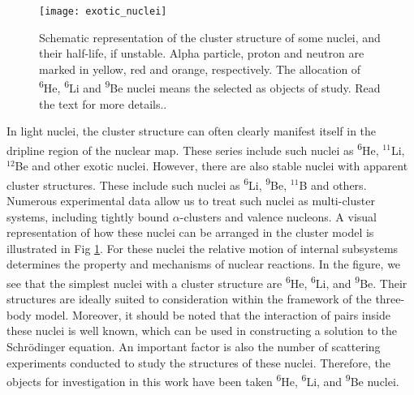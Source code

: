 \documentclass[
12pt, %
oneside, %
english, %
doublespacing, %
doublespacing, %
toctotoc, %
parskip, %
headsepline, %
]{MastersDoctoralThesis} %
\newcommand{\he}{\textsuperscript{6}He\xspace}
\newcommand{\li}{\textsuperscript{6}Li\xspace}
\newcommand{\be}{\textsuperscript{9}Be\xspace}
\begin{document}
\begin{figure}
\centering
\texttt{[image: exotic\_nuclei]}
\decoRule
\caption{ Schematic representation of the cluster structure of some nuclei, and their half-life, if unstable. Alpha particle, proton and neutron are marked in yellow, red and orange, respectively. The allocation of \he, \li and \be nuclei means the selected as objects of study. Read the text for more details..}
\label{fig:exotic_nuclei}
\end{figure}

In light nuclei, the cluster structure can often clearly  manifest itself in the dripline region of the nuclear map. 
These series include such nuclei as \he, $^{11}$Li, $^{12}$Be and other exotic nuclei. 
However, there are also stable nuclei with apparent cluster structures. These include such nuclei as \li, \be, $ ^{11}$B and others. Numerous experimental data \cite{canto2006fusion, brown2007, papka2007} allow us to treat such nuclei as multi-cluster systems, including tightly bound $\alpha$-clusters and valence nucleons. A visual representation of how these nuclei can be arranged in the cluster model is illustrated in Fig \ref{fig:exotic_nuclei}. 
For these nuclei the relative motion of internal subsystems determines the property and mechanisms of nuclear reactions. 
In the figure, we see that the simplest nuclei with a cluster structure are \he, \li, and \be. 
Their structures are ideally suited to consideration within the framework of the three-body model. 
Moreover, it should be noted that the interaction of pairs inside these nuclei is 
well known, which can be used in constructing a solution to the Schr\"{o}dinger equation. An important factor is also the number of scattering experiments conducted to study the structures of these nuclei.
Therefore, the objects for investigation in this work have been taken \he, \li, and \be nuclei.
\end{document}
